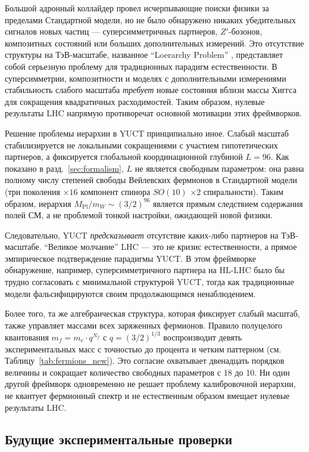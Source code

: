 \documentclass[11pt,a4paper]{article}
\begin{document}
	Большой адронный коллайдер провел исчерпывающие поиски физики за пределами Стандартной модели, но не было обнаружено никаких убедительных сигналов новых частиц — суперсимметричных партнеров, \(Z'\)-бозонов, композитных состояний или больших дополнительных измерений. Это отсутствие структуры на ТэВ-масштабе, названное ``Loerarchy Problem'' \cite{Koren2020}, представляет собой серьезную проблему для традиционных парадигм естественности. В суперсимметрии, композитности и моделях с дополнительными измерениями стабильность слабого масштаба \emph{требует} новые состояния вблизи массы Хиггса для сокращения квадратичных расходимостей. Таким образом, нулевые результаты LHC напрямую противоречат основной мотивации этих фреймворков.
	
	Решение проблемы иерархии в YUCT принципиально иное. Слабый масштаб стабилизируется не локальными сокращениями с участием гипотетических партнеров, а фиксируется глобальной координационной глубиной $L=96$. Как показано в разд.~\ref{sec:formalism}, $L$ не является свободным параметром: она равна полному числу степеней свободы Вейлевских фермионов в Стандартной модели (три поколения $\times 16$ компонент спинора $SO(10)$ $\times 2$ спиральности). Таким образом, иерархия $M_{\mathrm{Pl}}/m_W \sim (3/2)^{96}$ является прямым следствием содержания полей СМ, а не проблемой тонкой настройки, ожидающей новой физики.
	
	Следовательно, YUCT \emph{предсказывает} отсутствие каких-либо партнеров на ТэВ-масштабе. ``Великое молчание'' LHC — это не кризис естественности, а прямое эмпирическое подтверждение парадигмы YUCT. В этом фреймворке обнаружение, например, суперсимметричного партнера на HL-LHC было бы трудно согласовать с минимальной структурой YUCT, тогда как традиционные модели фальсифицируются своим продолжающимся ненаблюдением.
	
	Более того, та же алгебраическая структура, которая фиксирует слабый масштаб, также управляет массами всех заряженных фермионов. Правило полуцелого квантования $m_f = m_e \cdot q^{N_f}$ с $q = (3/2)^{1/3}$ воспроизводит девять экспериментальных масс с точностью до процента и четким паттерном (см. Таблицу~\ref{tab:fermions_new}). Это согласие охватывает двенадцать порядков величины и сокращает количество свободных параметров с 18 до 10. Ни один другой фреймворк одновременно не решает проблему калибровочной иерархии, не квантует фермионный спектр и не естественным образом вмещает нулевые результаты LHC.
	
	\subsection{Будущие экспериментальные проверки}
	
\end{document}

